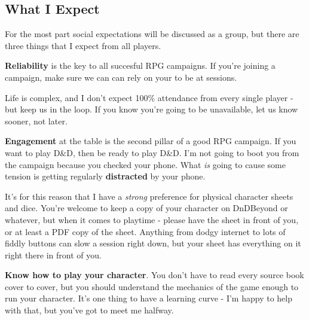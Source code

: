 \subsection{What I Expect}

For the most part social expectations will be discussed as a group, but there are three things that I expect from all players.

\textbf{Reliability} is the key to all succesful RPG campaigns. If you're joining a campaign, make sure we can can rely on your to be at sessions.

Life is complex, and I don't expect 100\% attendance from every single player - but keep us in the loop. If you know you're going to be unavailable, let us know sooner, not later.

\textbf{Engagement} at the table is the second pillar of a good RPG campaign. If you want to play D\&D, then be ready to play D\&D. I'm not going to boot you from the campaign because you checked your phone. What \textit{is} going to cause some tension is getting regularly \textbf{distracted} by your phone.

It's for this reason that I have a \textit{strong} preference for physical character sheets and dice. You're welcome to keep a copy of your character on DnDBeyond or whatever, but when it comes to playtime - please have the sheet in front of you, or at least a PDF copy of the sheet. Anything from dodgy internet to lots of fiddly buttons can slow a session right down, but your sheet has everything on it right there in front of you. 

\textbf{Know how to play your character}. You don't have to read every source book cover to cover, but you should understand the mechanics of the game enough to run your character. It's one thing to have a learning curve - I'm happy to help with that, but you've got to meet me halfway.
